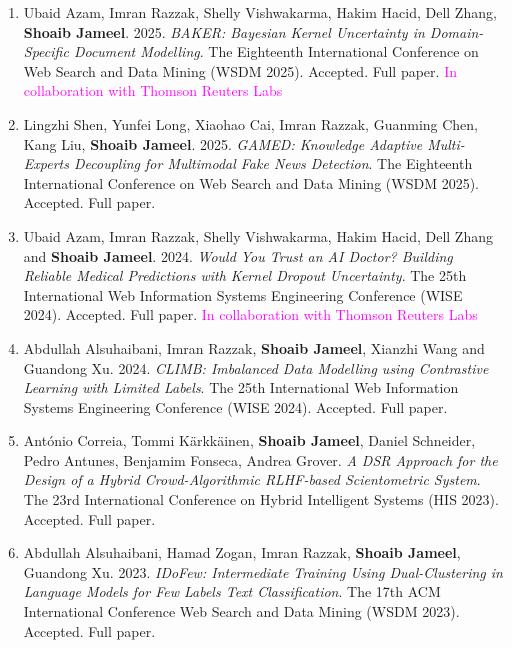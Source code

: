 \documentclass[margin]{res}
\begin{document}
\begin{resume}
\begin{enumerate}
\item Ubaid Azam, Imran Razzak, Shelly Vishwakarma, Hakim Hacid, Dell Zhang, \textbf{Shoaib Jameel}. 2025. \textit{BAKER: Bayesian Kernel Uncertainty in Domain-Specific Document Modelling}. The Eighteenth International Conference on Web Search and Data Mining (WSDM 2025). Accepted. Full paper. \textcolor{magenta}{In collaboration with Thomson Reuters Labs} \newline

\item Lingzhi Shen, Yunfei Long, Xiaohao Cai, Imran Razzak, Guanming Chen, Kang Liu, \textbf{Shoaib Jameel}. 2025. \textit{GAMED: Knowledge Adaptive Multi-Experts Decoupling for Multimodal Fake News Detection}.  The Eighteenth International Conference on Web Search and Data Mining (WSDM 2025). Accepted. Full paper. \newline

\item Ubaid Azam, Imran Razzak, Shelly Vishwakarma, Hakim Hacid, Dell Zhang and \textbf{Shoaib Jameel}. 2024. \textit{Would You Trust an AI Doctor? Building Reliable Medical Predictions with Kernel Dropout Uncertainty}. The 25th International Web Information Systems Engineering Conference (WISE 2024). Accepted. Full paper. \textcolor{magenta}{In collaboration with Thomson Reuters Labs} \newline

\item Abdullah Alsuhaibani, Imran Razzak, \textbf{Shoaib Jameel}, Xianzhi Wang and Guandong Xu. 2024. \textit{CLIMB: Imbalanced Data Modelling using Contrastive Learning with Limited Labels}. The 25th International Web Information Systems Engineering Conference (WISE 2024). Accepted. Full paper. \newline

\item Ant\'onio Correia, Tommi K\"arkk\"ainen, \textbf{Shoaib Jameel}, Daniel Schneider, Pedro Antunes, Benjamim Fonseca, Andrea Grover. \textit{A DSR Approach for the Design of a Hybrid Crowd-Algorithmic RLHF-based Scientometric System}. The 23rd International Conference on Hybrid Intelligent Systems (HIS 2023). Accepted. Full paper. \newline

\item Abdullah Alsuhaibani, Hamad Zogan, Imran Razzak, \textbf{Shoaib Jameel}, Guandong Xu. 2023. \textit{IDoFew: Intermediate Training Using Dual-Clustering in Language Models for Few Labels Text Classification}. The 17th ACM International Conference Web Search and Data Mining (WSDM 2023). Accepted. Full paper. \newline


\end{enumerate}
\end{resume}
\end{document}
